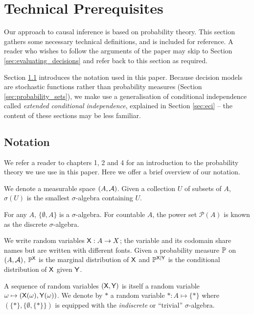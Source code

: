 
\section{Technical Prerequisites}\label{sec:tech_prereq}

Our approach to causal inference is based on probability theory. This section gathers some necessary technical definitions, and is included for reference. A reader who wishes to follow the arguments of the paper may skip to Section \ref{sec:evaluating_decisions} and refer back to this section as required.

Section \ref{sec:standard_prob} introduces the notation used in this paper. Because decision models are stochastic functions rather than probability measures (Section \ref{sec:probability_sets}), we make use a generalisation of conditional independence called \emph{extended conditional independence}, explained in Section \ref{sec:eci} -- the content of these sections may be less familiar.


\subsection{Notation}\label{sec:standard_prob}

We refer a reader to \citet{cinlar_probability_2011} chapters 1, 2 and 4 for an introduction to the probability theory we use use in this paper. Here we offer a brief overview of our notation.

We denote a measurable space $(A, \mathcal{A})$. Given a collection $U$ of subsets of $A$, $\sigma(U)$ is the smallest $\sigma$-algebra containing $U$.

For any $A$, $\{\emptyset,A\}$ is a $\sigma$-algebra. For countable $A$, the power set $\mathscr{P}(A)$ is known as the discrete $\sigma$-algebra.

We write random variables $\mathsf{X}:A\to X$; the variable and its codomain share names but are written with different fonts. Given a probability measure $\mathbb{P}$ on $(A,\mathcal{A})$, $\mathbb{P}^{\mathsf{X}}$ is the marginal distribution of $\mathsf{X}$ and $\mathbb{P}^{\mathsf{X}|\mathsf{Y}}$ is the conditional distribution of $\mathsf{X}$ given $\mathsf{Y}$.

A sequence of random variables $(\mathsf{X},\mathsf{Y})$ is itself a random variable $\omega\mapsto (\mathsf{X}(\omega), \mathsf{Y}(\omega))$. We denote by $*$ a random variable $*:A\mapsto \{*\}$ where $(\{*\}, \{\emptyset, \{*\}\})$ is equipped with the \emph{indiscrete} or ``trivial'' $\sigma$-algebra.

